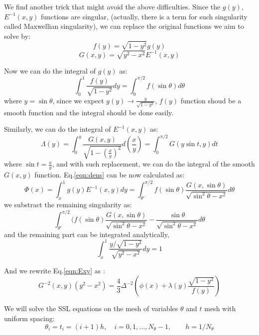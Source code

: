 \documentclass{article}
\begin{document}
We find another trick that might avoid the above difficulties. Since the $g(y)$, $E^{-1}(x,y)$ functions are singular,
(actually, there is a term for such singularity called Maxwellian singularity), we can replace the original functions
we aim to solve by:
\begin{equation}
 f(y)=\sqrt{1-y^2}g(y) 
 \end{equation}
 \begin{equation}
 G(x,y)=\sqrt{y^2-x^2}E^{-1}(x,y)
\end{equation}

Now we can do the integral of $g(y)$ as:
\begin{equation}
 \int^{1}_{0}\frac{f(y)}{\sqrt{1-y^2}}dy=\int^{\pi/2}_{0}f(\sin\theta)d\theta
\end{equation}
where $y=\sin\theta$, since we expect $g(y) \rightarrow \frac{y}{\sqrt{1-y^2}}$, $f(y)$ function shoud be a smooth function and the integral
should be done easily.

Similarly, we can do the integral of $E^{-1}(x,y)$ as:
\begin{equation}
\Lambda(y)= \int^{y}_{0}\frac{G(x,y)}{\sqrt{1-(\frac{x}{y})^2}}d(\frac{x}{y})=\int^{\pi/2}_{0}G(y\sin t,y)dt
\end{equation}
where $\sin t=\frac{x}{y}$, and with such replacement, we can do the integral of the smooth $G(x,y)$ function.
Eq.\ref{eqn:dens} can be now calculated as:
\begin{equation}
 \Phi(x)=\int^{1}_{x}g(y)E^{-1}(x,y)dy=\int^{\pi/2}_{\theta'}f(\sin \theta)\frac{G(x,\sin\theta)}{\sqrt{\sin^2\theta-x^2}}d\theta
\end{equation}
we substract the remaining singularity as:
\begin{equation}
 \int^{\pi/2}_{\theta'}(f(\sin \theta)\frac{G(x,\sin\theta)}{\sqrt{\sin^2\theta-x^2}}-\frac{\sin\theta}{\sqrt{\sin^2\theta-x^2}}d\theta
\end{equation}
and the remaining part can be integrated analytically,
\begin{equation}
 \int^{1}_{x}\frac{y/\sqrt{1-y^2}}{\sqrt{y^2-x^2}}dy=1
\end{equation}


And we rewrite Eq.\ref{eqn:Exy} as :
\begin{equation}
 G^{-2}(x,y)(y^2-x^2)=\frac{4}{3}\Delta^{-2}(\phi(x)+\lambda(y)\frac{\sqrt{1-y^2}}{f(y)})
\end{equation}

We will solve the SSL equations on the mesh of variables $\theta$ and $t$ mesh with uniform spacing:
\begin{equation}
 \theta_i=t_i=(i+1)h, \quad i=0,1,...,N_{\theta}-1, \qquad h=1/N_{\theta}
\end{equation}
\end{document}
